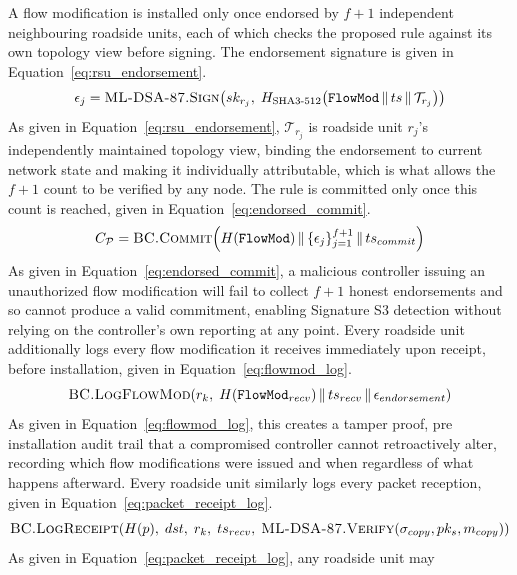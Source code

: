 \documentclass[final,5p,twocolumn]{elsarticle}
\theoremstyle{remark}
\theoremstyle{plain}
\begin{document}
A flow modification is installed only once endorsed by $f{+}1$ independent
neighbouring roadside units, each of which checks the proposed rule against
its own topology view before signing. The endorsement signature is given in
Equation~\eqref{eq:rsu_endorsement}.
\begin{equation}
	\epsilon_j = \textsc{ML-DSA-87.Sign}\!\left(sk_{r_j},\; H_{\text{SHA3-512}}\!\left(\texttt{FlowMod} \,\|\, ts \,\|\, \mathcal{T}_{r_j}\right)\right)
	\label{eq:rsu_endorsement}
\end{equation}
As given in Equation~\eqref{eq:rsu_endorsement}, $\mathcal{T}_{r_j}$ is
roadside unit $r_j$'s independently maintained topology view, binding the
endorsement to current network state and making it individually
attributable, which is what allows the $f{+}1$ count to be verified by any
node. The rule is committed only once this count is reached, given in
Equation~\eqref{eq:endorsed_commit}.
\begin{equation}
	C_{\mathcal{P}} = \textsc{BC.Commit}\!\left(H(\texttt{FlowMod}) \,\|\, \{\epsilon_j\}_{j=1}^{f+1} \,\|\, ts_{commit}\right)
	\label{eq:endorsed_commit}
\end{equation}
As given in Equation~\eqref{eq:endorsed_commit}, a malicious controller
issuing an unauthorized flow modification will fail to collect $f{+}1$
honest endorsements and so cannot produce a valid commitment, enabling
Signature S3 detection without relying on the controller's own reporting at
any point. Every roadside unit additionally logs every flow modification it
receives immediately upon receipt, before installation, given in
Equation~\eqref{eq:flowmod_log}.
\begin{equation}
	\textsc{BC.LogFlowMod}\!\left(r_k,\; H(\texttt{FlowMod}_{recv}) \,\|\, ts_{recv} \,\|\, \epsilon_{endorsement}\right)
	\label{eq:flowmod_log}
\end{equation}
As given in Equation~\eqref{eq:flowmod_log}, this creates a tamper proof,
pre installation audit trail that a compromised controller cannot
retroactively alter, recording which flow modifications were issued and
when regardless of what happens afterward. Every roadside unit similarly
logs every packet reception, given in Equation~\eqref{eq:packet_receipt_log}.
\begin{equation}
	\textsc{BC.LogReceipt}\!\left(H(p),\; dst,\; r_k,\; ts_{recv},\; \textsc{ML-DSA-87.Verify}(\sigma_{copy}, pk_s, m_{copy})\right)
	\label{eq:packet_receipt_log}
\end{equation}
As given in Equation~\eqref{eq:packet_receipt_log}, any roadside unit may
\end{document}
